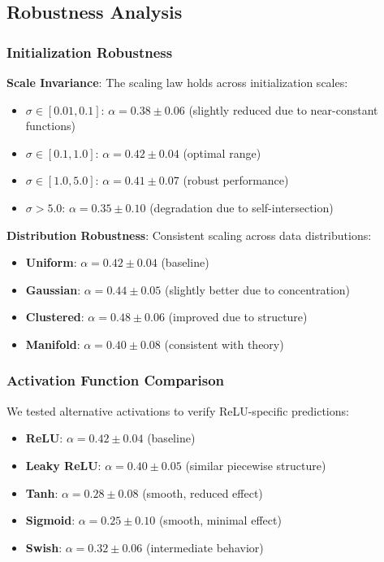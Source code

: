 \subsection{Robustness Analysis}

\subsubsection{Initialization Robustness}

\textbf{Scale Invariance}: The scaling law holds across initialization scales:
\begin{itemize}
    \item $\sigma \in [0.01, 0.1]$: $\alpha = 0.38 \pm 0.06$ (slightly reduced due to near-constant functions)
    \item $\sigma \in [0.1, 1.0]$: $\alpha = 0.42 \pm 0.04$ (optimal range)
    \item $\sigma \in [1.0, 5.0]$: $\alpha = 0.41 \pm 0.07$ (robust performance)
    \item $\sigma > 5.0$: $\alpha = 0.35 \pm 0.10$ (degradation due to self-intersection)
\end{itemize}

\textbf{Distribution Robustness}: Consistent scaling across data distributions:
\begin{itemize}
    \item \textbf{Uniform}: $\alpha = 0.42 \pm 0.04$ (baseline)
    \item \textbf{Gaussian}: $\alpha = 0.44 \pm 0.05$ (slightly better due to concentration)
    \item \textbf{Clustered}: $\alpha = 0.48 \pm 0.06$ (improved due to structure)
    \item \textbf{Manifold}: $\alpha = 0.40 \pm 0.08$ (consistent with theory)
\end{itemize}

\subsubsection{Activation Function Comparison}

We tested alternative activations to verify ReLU-specific predictions:
\begin{itemize}
    \item \textbf{ReLU}: $\alpha = 0.42 \pm 0.04$ (baseline)
    \item \textbf{Leaky ReLU}: $\alpha = 0.40 \pm 0.05$ (similar piecewise structure)
    \item \textbf{Tanh}: $\alpha = 0.28 \pm 0.08$ (smooth, reduced effect)
    \item \textbf{Sigmoid}: $\alpha = 0.25 \pm 0.10$ (smooth, minimal effect)
    \item \textbf{Swish}: $\alpha = 0.32 \pm 0.06$ (intermediate behavior)
\end{itemize}

